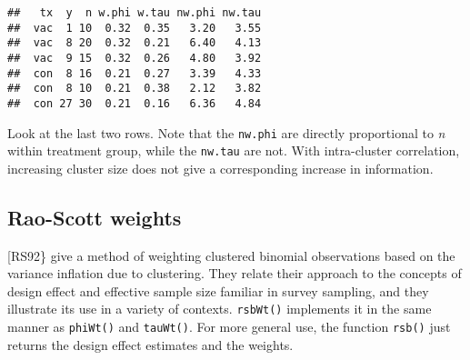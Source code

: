\documentclass[]{article}
\newenvironment{Shaded}{\begin{snugshade}}{\end{snugshade}}
\newcommand{\KeywordTok}[1]{\textcolor[rgb]{0.13,0.29,0.53}{\textbf{{#1}}}}
\newcommand{\DataTypeTok}[1]{\textcolor[rgb]{0.13,0.29,0.53}{{#1}}}
\newcommand{\DecValTok}[1]{\textcolor[rgb]{0.00,0.00,0.81}{{#1}}}
\newcommand{\StringTok}[1]{\textcolor[rgb]{0.31,0.60,0.02}{{#1}}}
\newcommand{\CommentTok}[1]{\textcolor[rgb]{0.56,0.35,0.01}{\textit{{#1}}}}
\newcommand{\NormalTok}[1]{{#1}}
\begin{document}
\begin{Shaded}
\end{Shaded}

\begin{verbatim}
##   tx  y  n w.phi w.tau nw.phi nw.tau
##  vac  1 10  0.32  0.35   3.20   3.55
##  vac  8 20  0.32  0.21   6.40   4.13
##  vac  9 15  0.32  0.26   4.80   3.92
##  con  8 16  0.21  0.27   3.39   4.33
##  con  8 10  0.21  0.38   2.12   3.82
##  con 27 30  0.21  0.16   6.36   4.84
\end{verbatim}

\bigskip
Look at the last two rows. Note that the \texttt{nw.phi} are directly
proportional to \emph{n} within treatment group, while the
\texttt{nw.tau} are not. With intra-cluster correlation, increasing
cluster size does not give a corresponding increase in information.
\bigskip

\subsection{Rao-Scott weights}

{[}RS92\} give a method of weighting clustered binomial observations
based on the variance inflation due to clustering. They relate their
approach to the concepts of design effect and effective sample size
familiar in survey sampling, and they illustrate its use in a variety of
contexts. \texttt{rsbWt()} implements it in the same manner as
\texttt{phiWt()} and \texttt{tauWt()}. For more general use, the
function \texttt{rsb()} just returns the design effect estimates and the
weights.
\end{document}
